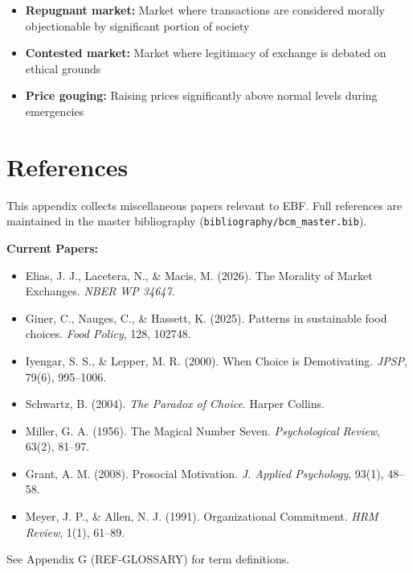 \begin{itemize}
    \item \textbf{Repugnant market:} Market where transactions are considered morally objectionable by significant portion of society
    \item \textbf{Contested market:} Market where legitimacy of exchange is debated on ethical grounds
    \item \textbf{Price gouging:} Raising prices significantly above normal levels during emergencies
\end{itemize}

\section{References}
\label{sec:ot-references}

\nocite{bcm_master}

This appendix collects miscellaneous papers relevant to EBF. Full references are maintained in the master bibliography (\texttt{bibliography/bcm\_master.bib}).

\textbf{Current Papers:}
\begin{itemize}
    \item Elias, J. J., Lacetera, N., \& Macis, M. (2026). The Morality of Market Exchanges. \textit{NBER WP 34647}.
    \item Giner, C., Nauges, C., \& Hassett, K. (2025). Patterns in sustainable food choices. \textit{Food Policy}, 128, 102748.
    \item Iyengar, S. S., \& Lepper, M. R. (2000). When Choice is Demotivating. \textit{JPSP}, 79(6), 995--1006.
    \item Schwartz, B. (2004). \textit{The Paradox of Choice}. Harper Collins.
    \item Miller, G. A. (1956). The Magical Number Seven. \textit{Psychological Review}, 63(2), 81--97.
    \item Grant, A. M. (2008). Prosocial Motivation. \textit{J. Applied Psychology}, 93(1), 48--58.
    \item Meyer, J. P., \& Allen, N. J. (1991). Organizational Commitment. \textit{HRM Review}, 1(1), 61--89.
\end{itemize}

See Appendix G (REF-GLOSSARY) for term definitions.


